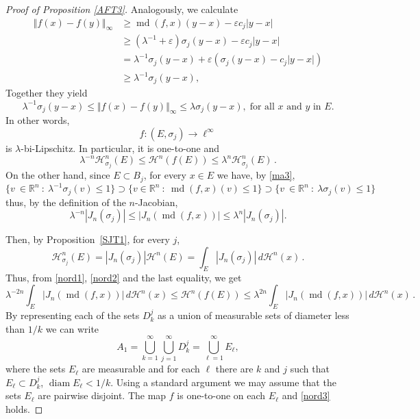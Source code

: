 \documentclass[12pt,leqno]{amsart}
\theoremstyle{definition}
\newcommand{\bbbr}{\mathbb R}
\newcommand{\eps}{\varepsilon}
\def\diam{\operatorname{diam}}
\def\H{{\mathcal H}}
\def\md{\operatorname{md}}
\numberwithin{theorem}{section} \numberwithin{equation}{section}
\begin{document}
\begin{proof}[Proof of Proposition \ref{AFT3}]
Analogously, we calculate
\begin{align*}
    \Vert f(x)-f(y)\Vert_\infty &\ge \md(f,x)(y-x)-\eps c_j|y-x| \\
    &\ge (\lambda^{-1}+\eps)\sigma_j(y-x)-\eps c_j|y-x|\\
    &= \lambda^{-1} \sigma_j(y-x) +\eps (\sigma_j(y-x)-c_j|y-x|)\\
    &\ge \lambda^{-1} \sigma_j(y-x),
\end{align*}
Together they yield
$$
\lambda^{-1} \sigma_j(y-x) \le \Vert f(x)-f(y)\Vert_\infty \le \lambda \sigma_j(y-x), \; \text{for all $x$ and $y$ in $E$}.
$$
In other words,
$$
f\colon (E,\sigma_j) \to \ell^\infty
$$
is $\lambda$-bi-Lipschitz. In particular, it is one-to-one and
\begin{equation}
\label{nord1}
 \lambda^{-n} \H^n_{\sigma_j}(E) \leq  \H^n(f(E)) \leq \lambda^n\H^n_{\sigma_j}(E) \, .
\end{equation}
On the other hand, since $E \subset B_j$,  for every $x \in E$ we have, by \eqref{ma3},
$$
\{v~\in \bbbr^n~:~\lambda^{-1}\sigma_j(v)\leq 1\}\supset \{v\in\bbbr^n~:~\md(f,x)(v)\leq 1\}\supset  \{v~\in \bbbr^n~:~\lambda\sigma_j(v)\leq 1\}
$$
thus, by the definition of the $n$-Jacobian,
\begin{equation}
\label{nord2}
\lambda^{-n} |J_n(\sigma_j)| \leq |J_n(\md(f,x))| \leq \lambda^n |J_n(\sigma_j)|.
\end{equation}

Then, by Proposition~\ref{SJT1},  for every $j$,
$$
\H^n_{\sigma_j}(E) = |J_n(\sigma_j)| \H^n(E) = \int_{E} |J_n(\sigma_j)| \, d\H^n(x) \, .
$$
Thus, from \eqref{nord1}, \eqref{nord2} and the last equality, we get
\begin{equation}
\label{nord3}
 \lambda^{-2n} \int_{E} |J_n(\md(f,x))| \, d\H^n(x)  \leq  \H^n(f(E))  \leq \lambda^{2n}\int_{E} |J_n(\md(f,x))| \, d\H^n(x)  \, .
\end{equation}
By representing each of the sets $D_k^j$ as a union of measurable sets of diameter less than $1/k$ we can write
$$
A_1=\bigcup_{k=1}^\infty\bigcup_{j=1}^\infty D_k^j=\bigcup_{\ell=1}^\infty E_\ell,
$$
where the sets $E_\ell$ are measurable and for each $\ell$ there are $k$ and $j$ such that $E_\ell\subset D_k^j$, $\diam E_\ell<1/k$. Using a standard argument we may assume that the sets $E_\ell$ are pairwise disjoint. The map $f$ is one-to-one on each $E_\ell$ and \eqref{nord3} holds.


\end{proof}
\end{document}
